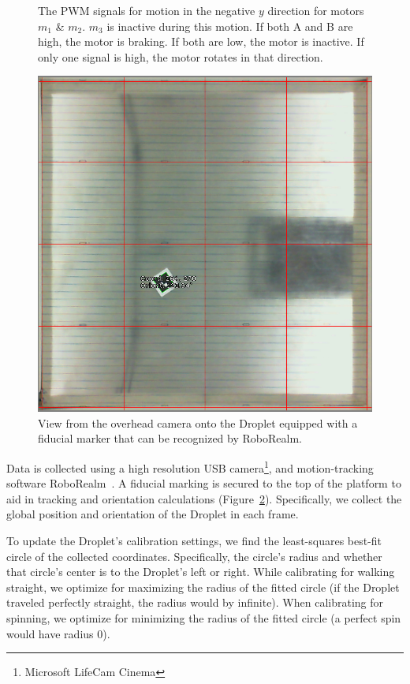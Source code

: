 \documentclass[letterpaper, 10pt, conference]{ieeeconf}
\begin{document}
\begin{figure}[!htb]
\centering

\caption{The PWM signals for motion in the negative $y$ direction for motors $m_1$ \& $m_2$. $m_3$ is inactive during this motion. If both A and B are high, the motor is braking. If both are low, the motor is inactive. If only one signal is high, the motor rotates in that direction.}
\label{fig:pwmSignals}
\end{figure}

\begin{figure}[!htb]
\centering
\includegraphics[width=0.8\linewidth]{images/cameraView}
\caption{View from the overhead camera onto the Droplet equipped with a fiducial marker that can be recognized by RoboRealm.\label{fig:expsetup}} 
\end{figure}

Data is collected using a high resolution USB camera\footnote{Microsoft LifeCam Cinema}, and motion-tracking software RoboRealm~\cite{RoboRealm}. A fiducial marking is secured to the top of the platform to aid in tracking and orientation calculations (Figure~\ref{fig:expsetup}). Specifically, we collect the global position and orientation of the Droplet in each frame.

To update the Droplet's calibration settings, we find the least-squares best-fit circle of the collected coordinates. Specifically, the circle's radius and whether that circle's center is to the Droplet's left or right. While calibrating for walking straight, we optimize for maximizing the radius of the fitted circle (if the Droplet traveled perfectly straight, the radius would by infinite). When calibrating for spinning, we optimize for minimizing the radius of the fitted circle (a perfect spin would have radius 0).
\end{document}
